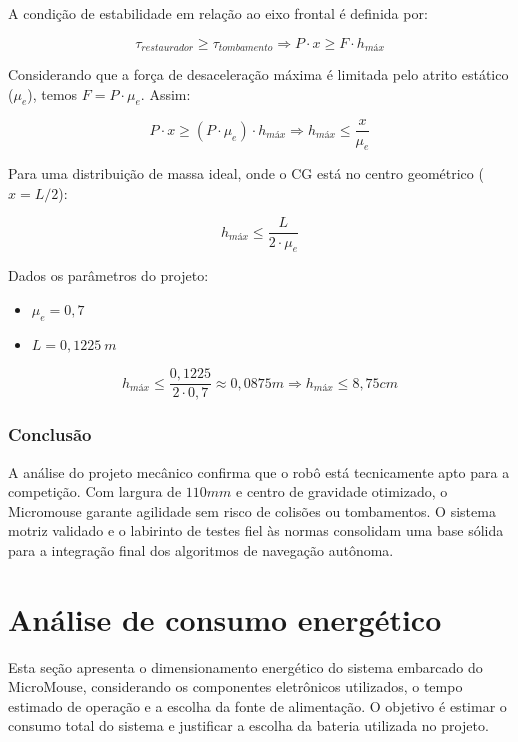A condição de estabilidade em relação ao eixo frontal é definida por:

\begin{equation}
    \tau_{{restaurador}} \geq \tau_{{tombamento}}\Longrightarrow P \cdot x \geq F \cdot h_{{máx}}
\end{equation}

Considerando que a força de desaceleração máxima é limitada pelo atrito estático ($\mu_e$), temos $F = P \cdot \mu_e$. Assim:

\begin{equation}
    P \cdot x \geq (P \cdot \mu_e) \cdot h_{máx}\Longrightarrow h_{{máx}} \le \frac{x}{\mu_e}
\end{equation}

Para uma distribuição de massa ideal, onde o CG está no centro geométrico ($x = L/2$):

\begin{equation}
    h_{{máx}}\le\frac{L}{2\cdot\mu_e}
\end{equation}

Dados os parâmetros do projeto:
\begin{itemize}
    \item $\mu_e = 0,7$
    \item $L = 0,1225~{m}$
\end{itemize}

\begin{equation}
    h_{máx}\le \frac{0,1225}{2 \cdot 0,7} \approx 0,0875{m} \Longrightarrow h_{máx} \le 8,75{cm}
\end{equation}

\subsubsection{Conclusão}
A análise do projeto mecânico confirma que o robô está tecnicamente apto para a competição. Com largura de $110{ mm}$ e centro de gravidade otimizado, o Micromouse garante agilidade sem risco de colisões ou tombamentos. O sistema motriz validado e o labirinto de testes fiel às normas consolidam uma base sólida para a integração final dos algoritmos de navegação autônoma.

\section{Análise de consumo energético}

Esta seção apresenta o dimensionamento energético do sistema embarcado do MicroMouse, considerando os componentes eletrônicos utilizados, o tempo estimado de operação e a escolha da fonte de alimentação. O objetivo é estimar o consumo total do sistema e justificar a escolha da bateria utilizada no projeto.

